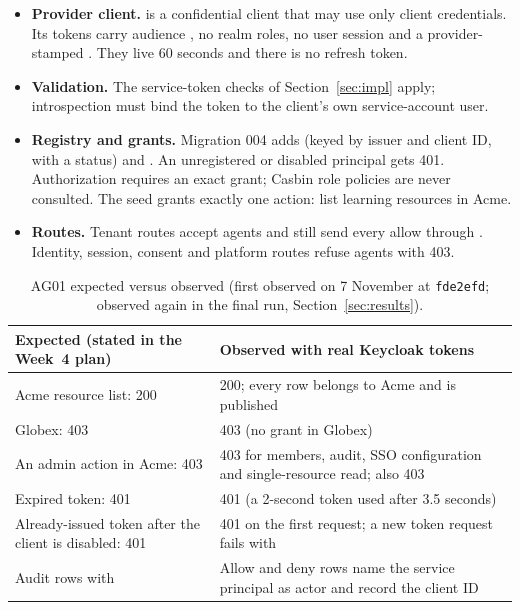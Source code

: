 \begin{itemize}
  \item \textbf{Provider client.}  is a confidential client that may use only client credentials. Its tokens carry audience , no realm roles, no user session and a provider-stamped . They live 60 seconds and there is no refresh token.
  \item \textbf{Validation.} The service-token checks of Section~\ref{sec:impl} apply; introspection must bind the token to the client's own service-account user.
  \item \textbf{Registry and grants.} Migration 004 adds  (keyed by issuer and client ID, with a status) and . An unregistered or disabled principal gets 401. Authorization requires an exact grant; Casbin role policies are never consulted. The seed grants exactly one action: list learning resources in Acme.
  \item \textbf{Routes.} Tenant routes accept agents and still send every allow through . Identity, session, consent and platform routes refuse agents with 403.
\end{itemize}

\begin{table}[H]
\centering
\small
\begin{tabularx}{\textwidth}{@{}L L@{}}
\toprule
\textbf{Expected (stated in the Week~4 plan)} & \textbf{Observed with real Keycloak tokens}\\
\midrule
Acme resource list: 200 & 200; every row belongs to Acme and is published\\
Globex: 403 & 403  (no grant in Globex)\\
An admin action in Acme: 403 & 403 for members, audit, SSO configuration and single-resource read;  also 403\\
Expired token: 401 & 401 (a 2-second token used after 3.5 seconds)\\
Already-issued token after the client is disabled: 401 & 401 on the first request; a new token request fails with \\
Audit rows with  & Allow and deny rows name the service principal as actor and record the client ID\\
\bottomrule
\end{tabularx}
\caption{AG01 expected versus observed (first observed on 7 November at \texttt{fde2efd}; observed again in the final run, Section~\ref{sec:results}).}
\end{table}

